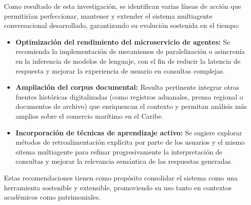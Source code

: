 \suggestions

Como resultado de esta investigación, se identifican varias líneas de acción que permitirían perfeccionar, mantener y extender el sistema multiagente conversacional desarrollado, garantizando su evolución sostenida en el tiempo:

\begin{itemize}
	\item \textbf{Optimización del rendimiento del microservicio de agentes:} Se recomienda la implementación de mecanismos de paralelización o asincronía en la inferencia de modelos de lenguaje, con el fin de reducir la latencia de respuesta y mejorar la experiencia de usuario en consultas complejas.
	
	\item \textbf{Ampliación del corpus documental:} Resulta pertinente integrar otras fuentes históricas digitalizadas (como registros aduanales, prensa regional o documentos de archivo) que enriquezcan el contexto y permitan análisis más amplios sobre el comercio marítimo en el Caribe.
	
	\item \textbf{Incorporación de técnicas de aprendizaje activo:} Se sugiere explorar métodos de retroalimentación explícita por parte de los usuarios y el mismo sitema multiagente para refinar progresivamente la interpretación de consultas y mejorar la relevancia semántica de las respuestas generadas.
	
\end{itemize}

Estas recomendaciones tienen como propósito consolidar el sistema como una herramienta sostenible y extensible, promoviendo su uso tanto en contextos académicos como patrimoniales.

